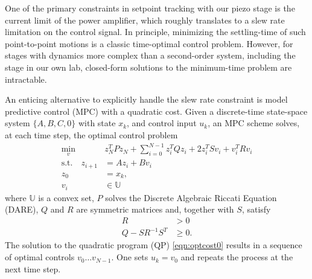 \documentclass[twocolumn,twoside]{IEEEtran}
\begin{document}
One of the primary constraints in setpoint tracking with our piezo stage is the current limit of the power amplifier,  which roughly translates to a slew rate limitation on the control signal.
In principle, minimizing the settling-time of such point-to-point motions is a classic time-optimal control problem. %
However, for stages with dynamics more complex than a second-order system,  including the stage in our own lab, closed-form solutions to the minimum-time problem are intractable.


An enticing alternative to explicitly handle the slew rate constraint is model predictive control (MPC) with a quadratic cost.
Given a discrete-time state-space system $\{A,B,C,0\}$ with state $x_k$, and control input $u_k$, an MPC scheme solves, at each time step, the optimal control problem 
\begin{subequations}
\begin{align}
\min_{v}\:\:& z^T_{N}Pz_{N} + \sum_{i=0}^{N-1}z_{i}^{T}Qz_{i} + 2z^T_iSv_i + v^{T}_{i}Rv_{i} \\
 \text{s.t.} \quad z_{i+1} &= A z_{i} + B v_{i}\\
z_{0} &= x_{k}, \\
v_i  &\in \mathds{U}
\end{align}\label{eqn:optcost0}%
\end{subequations}
where $\mathds{U}$ is a convex set, $P$ solves the Discrete Algebraic Riccati Equation (DARE), $Q$ and $R$ are symmetric matrices and, together with $S$, satisfy
\begin{align}
  R &> 0 \label{eqn:schur0}\\
  Q - SR^{-1}S^T &\geq 0. \label{eqn:schur1}
\end{align}
The solution to the quadratic program (QP) \eqref{eqn:optcost0} results in a sequence of optimal controls $v_0\dots v_{N-1}$. One sets $u_k = v_0$ and repeats the process at the next time step.
\end{document}
